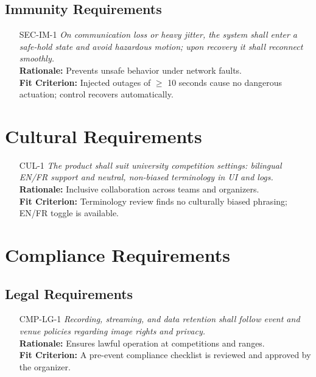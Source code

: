 \documentclass[12pt]{article}
\begin{document}
\subsection{Immunity Requirements}
\begin{itemize}[leftmargin=*]
  \item[SEC-IM-1] \emph{On communication loss or heavy jitter, the system shall enter a
          safe-hold state and avoid hazardous motion; upon recovery it shall reconnect
          smoothly.}\\ \textbf{Rationale:} Prevents unsafe behavior under network
        faults.\\ \textbf{Fit Criterion:} Injected outages of $\geq$ 10 seconds cause
        no dangerous actuation; control recovers automatically.
\end{itemize}

\section{Cultural Requirements}
\begin{itemize}[leftmargin=*]
  \item[CUL-1] \emph{The product shall suit university competition settings: bilingual
          EN/FR support and neutral, non-biased terminology in UI and logs.}\\
        \textbf{Rationale:} Inclusive collaboration across teams and organizers.\\
        \textbf{Fit Criterion:} Terminology review finds no culturally biased phrasing;
        EN/FR toggle is available.
\end{itemize}

\section{Compliance Requirements}
\subsection{Legal Requirements}
\begin{itemize}[leftmargin=*]
  \item[CMP-LG-1] \emph{Recording, streaming, and data retention shall follow event and
          venue policies regarding image rights and privacy.}\\ \textbf{Rationale:}
        Ensures lawful operation at competitions and ranges.\\ \textbf{Fit Criterion:}
        A pre-event compliance checklist is reviewed and approved by the organizer.
\end{itemize}
\end{document}
